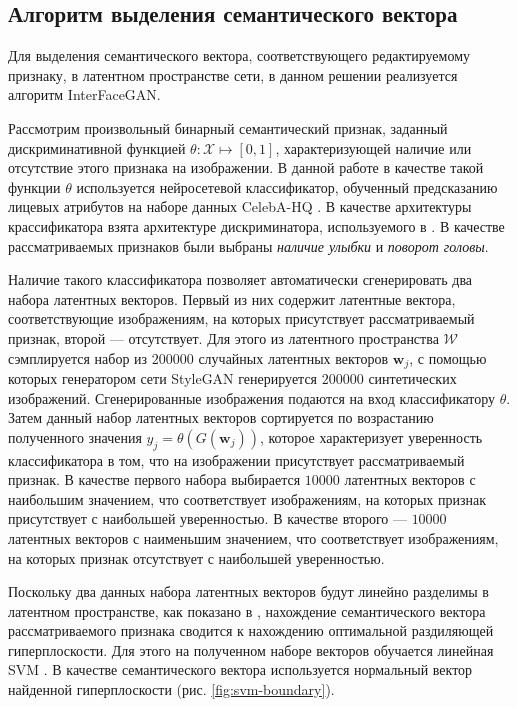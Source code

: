 

\subsection{Алгоритм выделения семантического вектора}

Для выделения семантического вектора, соответствующего редактируемому признаку, в латентном пространстве сети, в данном решении реализуется алгоритм InterFaceGAN.

Рассмотрим произвольный бинарный семантический признак, заданный дискриминативной функцией $\theta : \mathcal X \mapsto [0,1]$, характеризующей наличие или отсутствие этого признака на изображении. 
В данной работе в качестве такой функции $\theta$ используется нейросетевой классификатор, обученный предсказанию лицевых атрибутов на наборе данных CelebA-HQ \cite{liu2015celeba, progressive-growing-gan}.
В качестве архитектуры крассификатора взята архитектуре дискриминатора, используемого в \cite{progressive-growing-gan, StyleGAN}. 
В качестве рассматриваемых признаков были выбраны \emph{наличие улыбки} и \emph{поворот головы}.

Наличие такого классификатора позволяет автоматически сгенерировать два набора латентных векторов. Первый из них содержит латентные вектора, соответствующие изображениям, на которых присутствует рассматриваемый признак, второй --- отсутствует.
Для этого из латентного пространства $\mathcal W$ сэмплируется набор из $200000$ случайных латентных векторов $\mathbf w_j$, с помощью которых генератором сети StyleGAN генерируется $200000$ синтетических изображений.
Сгенерированные изображения подаются на вход классификатору $\theta$. Затем данный набор латентных векторов сортируется по возрастанию полученного значения $ y_j = \theta(G(\mathbf w_j))$, которое характеризует уверенность классификатора в том, что на изображении присутствует рассматриваемый признак.
В качестве первого набора выбирается $10000$ латентных векторов с наибольшим значением, что соответствует изображениям, на которых признак присутствует с наибольшей уверенностью.
В качестве второго --- $10000$ латентных векторов с наименьшим значением, что соответствует изображениям, на которых признак отсутствует с наибольшей уверенностью.

Поскольку два данных набора латентных векторов будут линейно разделимы в латентном пространстве, как показано в \cite{StyleGAN}, нахождение семантического вектора рассматриваемого признака сводится к нахождению оптимальной раздиляющей гиперплоскости. 
Для этого на полученном наборе векторов обучается линейная SVM \cite{svm}.
В качестве семантического вектора используется нормальный вектор найденной гиперплоскости (рис. \ref{fig:svm-boundary}).

